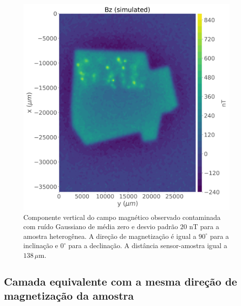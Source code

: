 \begin{figure}
	\centering
	\includegraphics[width=.8\textwidth]{Fig/mag_vec/simulacao_real_correto/noisy_bz_sample.png}
	\caption{Componente vertical do campo magnético observado contaminada com ruído Gaussiano de média zero e desvio padrão $20$ nT para a amostra heterogênea. A direção de magnetização é igual a $90^\circ$ para a inclinação e $0^\circ$ para a declinação. A distância sensor-amostra igual a $138\, \mu $m. }
	\label{fig:bz_hetero_sample}
\end{figure}


\subsection{Camada equivalente com a mesma direção de magnetização da amostra}
\label{subsec:hetero_same_dir}

